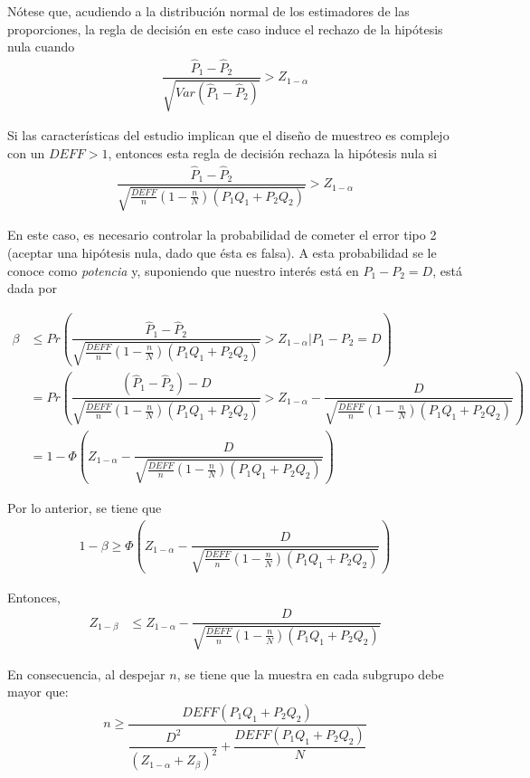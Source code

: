 \documentclass[
  12pt,
  spanish,
]{book}
\begin{document}
Nótese que, acudiendo a la distribución normal de los estimadores de las proporciones, la regla de decisión en este caso induce el rechazo de la hipótesis nula cuando
\begin{align*}
\dfrac{\hat{P}_1-\hat{P}_2}{\sqrt{Var(\hat{P}_1-\hat{P}_2)}} > Z_{1-\alpha}
\end{align*}

Si las características del estudio implican que el diseño de muestreo es complejo con un \(DEFF > 1\), entonces esta regla de decisión rechaza la hipótesis nula si
\begin{align*}
\dfrac{\hat{P}_1-\hat{P}_2}{\sqrt{\frac{DEFF}{n}\left(1-\frac{n}{N}\right)(P_1Q_1+P_2Q_2)}} > Z_{1-\alpha}
\end{align*}

En este caso, es necesario controlar la probabilidad de cometer el error tipo 2 (aceptar una hipótesis nula, dado que ésta es falsa). A esta probabilidad se le conoce como \emph{potencia} y, suponiendo que nuestro interés está en \(P_1 -P_2 =D\), está dada por

\begin{align*}
\beta &\leq Pr\left(\dfrac{\hat{P}_1-\hat{P}_2}{\sqrt{\frac{DEFF}{n}\left(1-\frac{n}{N}\right)(P_1Q_1+P_2Q_2)}} > Z_{1-\alpha} \left. | \right. P_1 -P_2 =D \right)\\
&= Pr\left(\dfrac{(\hat{P}_1-\hat{P}_2)-D}{\sqrt{\frac{DEFF}{n}\left(1-\frac{n}{N}\right)(P_1Q_1+P_2Q_2)}} > Z_{1-\alpha} - \dfrac{D}{\sqrt{\frac{DEFF}{n}\left(1-\frac{n}{N}\right)(P_1Q_1+P_2Q_2)}} \right)\\
&= 1-\Phi\left(Z_{1-\alpha} - \dfrac{D}{\sqrt{\frac{DEFF}{n}\left(1-\frac{n}{N}\right)(P_1Q_1+P_2Q_2)}} \right)
\end{align*}

Por lo anterior, se tiene que
\begin{align*}
1-\beta \geq \Phi\left(Z_{1-\alpha} - \dfrac{D}{\sqrt{\frac{DEFF}{n}\left(1-\frac{n}{N}\right)(P_1Q_1+P_2Q_2)}} \right)
\end{align*}

Entonces,
\begin{align*}
Z_{1-\beta}& \leq Z_{1-\alpha} - \dfrac{D}{\sqrt{\frac{DEFF}{n}\left(1-\frac{n}{N}\right)(P_1Q_1+P_2Q_2)}} 
\end{align*}

En consecuencia, al despejar \(n\), se tiene que la muestra en cada subgrupo debe mayor que:
\begin{align}
n \geq \dfrac{DEFF(P_1Q_1+P_2Q_2)}{\dfrac{D^2}{(Z_{1-\alpha}+Z_{\beta})^2}+\dfrac{DEFF(P_1Q_1+P_2Q_2)}{N}}
 \end{align}
\end{document}
